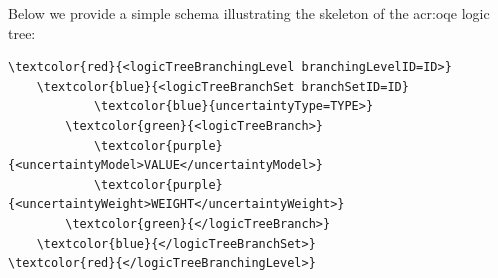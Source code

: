 Below we provide a simple schema illustrating the skeleton of the 
\gls{acr:oqe} logic tree:
\begin{Verbatim}[frame=single, commandchars=\\\{\}, fontsize=\small]
\textcolor{red}{<logicTreeBranchingLevel branchingLevelID=ID>}
    \textcolor{blue}{<logicTreeBranchSet branchSetID=ID}
            \textcolor{blue}{uncertaintyType=TYPE>}
        \textcolor{green}{<logicTreeBranch>}
            \textcolor{purple}{<uncertaintyModel>VALUE</uncertaintyModel>}
            \textcolor{purple}{<uncertaintyWeight>WEIGHT</uncertaintyWeight>}
        \textcolor{green}{</logicTreeBranch>}
    \textcolor{blue}{</logicTreeBranchSet>}
\textcolor{red}{</logicTreeBranchingLevel>}
\end{Verbatim}

